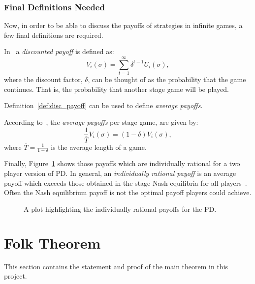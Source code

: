 \subsubsection{Final Definitions Needed}\label{subsubsec:Final_Defs_Needed}
Now, in order to be able to discuss the payoffs of strategies in infinite games,
a few final definitions are required.

\begin{definition}
In~\cite{Knight2017b} a \textit{discounted payoff} is defined as:
\begin{equation}
    V_{i}(\sigma) = \sum_{t=1}^{\infty}{\delta^{t-1}U_{i}(\sigma)},
\end{equation}
where the discount factor, \(\delta \), can be thought of as the probability
that the game continues. That is, the probability that another stage game will
be played. 
\end{definition}\label{def:disc_payoff}

Definition~\ref{def:disc_payoff} can be used to define \textit{average payoffs}.

\begin{definition}
    According to~\cite{Knight2017b}, the \textit{average payoffs} per stage
    game, are given by:
   \begin{equation}
        \frac{1}{\overline{T}}V_{i}(\sigma) = (1-\delta)V_{i}(\sigma),    
    \end{equation}
    where \(\overline{T} = \frac{1}{1-\delta}\) is the average length of a game. 
\end{definition}

Finally, Figure~\ref{fig:Feasible_Payoff_Plot} shows those payoffs which are
individually rational for a two player version of PD\@. In
general, an \textit{individually rational payoff} is an average payoff which
exceeds those obtained in the stage Nash equilibria for all
players~\cite{Knight2017b}. Often the Nash equilibrium payoff is not the
optimal payoff players could achieve.

\begin{figure}
    \centering
    
    \caption{A plot highlighting the individually rational payoffs for the PD.}\label{fig:Feasible_Payoff_Plot}
\end{figure}

\section{Folk Theorem}\label{sec:Folk_Thm}
This section contains the statement and proof of the main theorem in this project.

